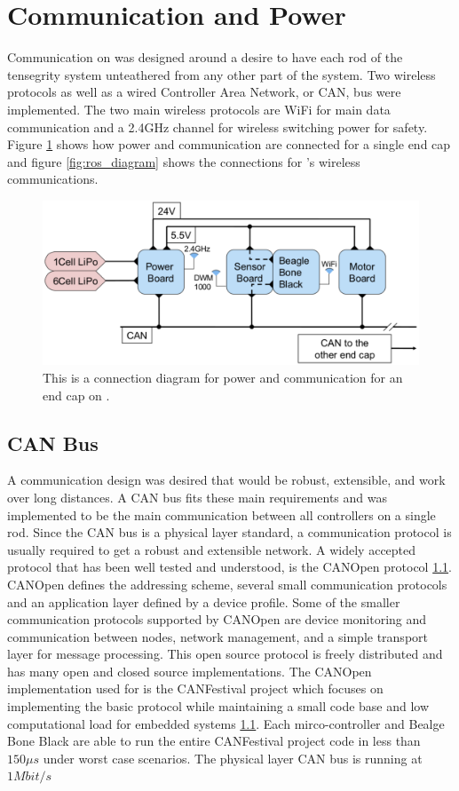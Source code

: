\section{Communication and Power}
\label{communication}

Communication on \SB{} was designed around a desire to have each rod of the tensegrity system unteathered from any other part of the system.
Two wireless protocols as well as a wired Controller Area Network, or CAN, bus were implemented.
The two main wireless protocols are WiFi for main data communication and a 2.4GHz channel for wireless switching power for safety.
Figure \ref{fig:connection_diagram} shows how power and communication are connected for a single end cap and figure \ref{fig:ros_diagram} shows the connections for \SB{}'s wireless communications.

\begin{figure}[thpb]%
      \centering
      \includegraphics[width=0.8\columnwidth]{tex/img/hard_wire_connection}
      \caption{This is a connection diagram for power and communication for an end cap on \SB{}.}
      \label{fig:connection_diagram}
\end{figure}

\subsection{CAN Bus}
A communication design was desired that would be robust, extensible, and work over long distances.
A CAN bus fits these main requirements and was implemented to be the main communication between all controllers on a single rod.
Since the CAN bus is a physical layer standard, a communication protocol is usually required to get a robust and extensible network.
A widely accepted protocol that has been well tested and understood, is the CANOpen protocol \ref{}.
CANOpen defines the addressing scheme, several small communication protocols and an application layer defined by a device profile.
Some of the smaller communication protocols supported by CANOpen are device monitoring and communication between nodes, network management, and a simple transport layer for message processing.
This open source protocol is freely distributed and has many open and closed source implementations.
The CANOpen implementation used for \SB{} is the CANFestival project which focuses on implementing the basic protocol while maintaining a small code base and low computational load for embedded systems \ref{}.
Each mirco-controller and Bealge Bone Black are able to run the entire CANFestival project code in less than \(150 \mu s\) under worst case scenarios.
The physical layer CAN bus is running at \(1 Mbit/s\) 

